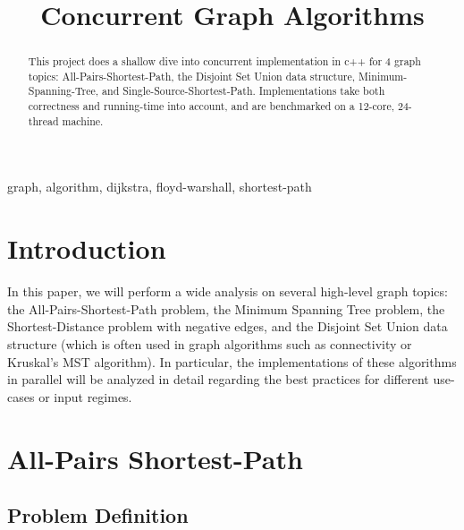 \documentclass[conference]{IEEEtran}
\begin{document}
\title{Concurrent Graph Algorithms}

\author{
\and
{}
\and
{}
\and
{}}

\maketitle

\begin{abstract}
This project does a shallow dive into concurrent implementation in c++ for 4 graph topics: All-Pairs-Shortest-Path, the Disjoint Set Union data structure, Minimum-Spanning-Tree, and Single-Source-Shortest-Path. Implementations take both correctness and running-time into account, and are benchmarked on a 12-core, 24-thread machine. 
\end{abstract}

\begin{IEEEkeywords}
graph, algorithm, dijkstra, floyd-warshall, shortest-path
\end{IEEEkeywords}

\section{Introduction}
In this paper, we will perform a wide analysis on several high-level graph topics: the All-Pairs-Shortest-Path problem, the Minimum Spanning Tree problem, the Shortest-Distance problem with negative edges, and the Disjoint Set Union data structure (which is often used in graph algorithms such as connectivity or Kruskal's MST algorithm). In particular, the implementations of these algorithms in parallel will be analyzed in detail regarding the best practices for different use-cases or input regimes. 
\section{All-Pairs Shortest-Path}

\subsection{Problem Definition}
\end{document}
